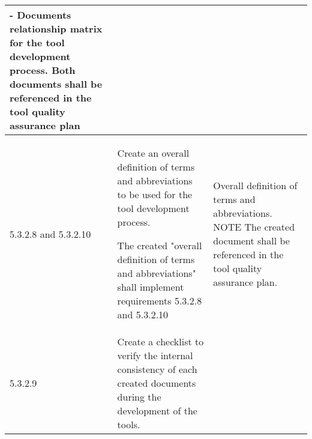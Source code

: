 \documentclass{template/openetcs_report}
\begin{document}
{\begin{longtable}{|p{2cm}|p{9cm}|p{3cm}|}
- Documents relationship matrix for the tool development process.
\linebreak
\linebreak
Both documents shall be referenced in the tool quality assurance plan\\ 
\hline
5.3.2.8 and 5.3.2.10 & Create an overall definition of terms and abbreviations to be used for the tool development process. 

The created "overall definition of terms and abbreviations" shall implement requirements 5.3.2.8 and 5.3.2.10
& Overall definition of terms and abbreviations.
\linebreak
\linebreak
NOTE\linebreak
The created document shall be referenced in the tool quality assurance plan.\\ 
\hline
5.3.2.9 & Create a checklist to verify the internal consistency of each created documents during the development of the tools.



\end{longtable}}
\end{document}

